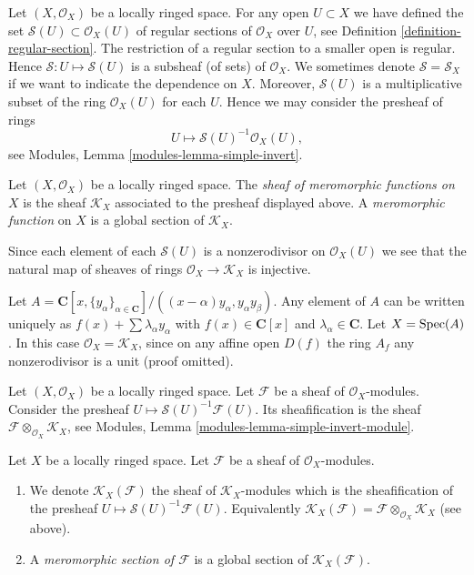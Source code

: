 \medskip\noindent
Let $(X, \mathcal{O}_X)$ be a locally ringed space.
For any open $U \subset X$ we have defined the set
$\mathcal{S}(U) \subset \mathcal{O}_X(U)$
of regular sections of $\mathcal{O}_X$ over $U$, see
Definition \ref{definition-regular-section}. The restriction
of a regular section to a smaller open is regular. Hence
$\mathcal{S} : U \mapsto \mathcal{S}(U)$ is a subsheaf (of sets)
of $\mathcal{O}_X$. We sometimes denote $\mathcal{S} = \mathcal{S}_X$
if we want to indicate the dependence on $X$.
Moreover, $\mathcal{S}(U)$
is a multiplicative subset of the ring $\mathcal{O}_X(U)$ for
each $U$. Hence we may consider
the presheaf of rings
$$
U \longmapsto \mathcal{S}(U)^{-1} \mathcal{O}_X(U),
$$
see Modules, Lemma \ref{modules-lemma-simple-invert}.

\begin{definition}
\label{definition-sheaf-meromorphic-functions}
Let $(X, \mathcal{O}_X)$ be a locally ringed space.
The {\it sheaf of meromorphic functions on $X$} is
the sheaf {\it $\mathcal{K}_X$} associated to the presheaf
displayed above. A {\it meromorphic function} on $X$
is a global section of $\mathcal{K}_X$.
\end{definition}

\noindent
Since each element of each $\mathcal{S}(U)$ is a nonzerodivisor on
$\mathcal{O}_X(U)$ we see that the natural map of sheaves
of rings $\mathcal{O}_X \to \mathcal{K}_X$ is injective.

\begin{example}
\label{example-no-change}
Let $A = \mathbf{C}[x, \{y_\alpha\}_{\alpha \in \mathbf{C}}]/
((x - \alpha)y_\alpha, y_\alpha y_\beta)$. Any element of $A$
can be written uniquely as
$f(x) + \sum \lambda_\alpha y_\alpha$ with $f(x) \in \mathbf{C}[x]$
and $\lambda_\alpha \in \mathbf{C}$.
Let $X = \mathop{\mathrm{Spec}}(A)$.
In this case $\mathcal{O}_X = \mathcal{K}_X$, since on
any affine open $D(f)$ the ring $A_f$ any nonzerodivisor is
a unit (proof omitted).
\end{example}

\noindent
Let $(X, \mathcal{O}_X)$ be a locally ringed space.
Let $\mathcal{F}$ be a sheaf of $\mathcal{O}_X$-modules.
Consider the presheaf $U \mapsto \mathcal{S}(U)^{-1}\mathcal{F}(U)$.
Its sheafification is the sheaf
$\mathcal{F} \otimes_{\mathcal{O}_X} \mathcal{K}_X$, see
Modules, Lemma \ref{modules-lemma-simple-invert-module}.

\begin{definition}
\label{definition-meromorphic-section}
Let $X$ be a locally ringed space.
Let $\mathcal{F}$ be a sheaf of $\mathcal{O}_X$-modules.
\begin{enumerate}
\item We denote
$\mathcal{K}_X(\mathcal{F})$
the sheaf of $\mathcal{K}_X$-modules which is
the sheafification of the presheaf
$U \mapsto \mathcal{S}(U)^{-1}\mathcal{F}(U)$. Equivalently
$\mathcal{K}_X(\mathcal{F}) =
\mathcal{F} \otimes_{\mathcal{O}_X} \mathcal{K}_X$ (see above).
\item A {\it meromorphic section of $\mathcal{F}$}
is a global section of $\mathcal{K}_X(\mathcal{F})$.
\end{enumerate}
\end{definition}

